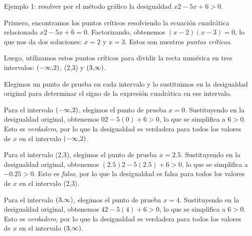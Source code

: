 \documentclass[a4paper,12pt]{article}
\begin{document}
\vspace{0.5cm}

Ejemplo 1: resolver por el método gráfico la desigualdad $x2-5x+6 > 0$.\par

\vspace{0.5cm}

Primero, encontramos los puntos críticos resolviendo la ecuación cuadrática relacionada $x2-5x+6=0$. Factorizando, obtenemos $(x-2)(x-3)=0$, lo que nos da dos soluciones: $x=2$ y $x=3$. Estos son nuestros \emph{puntos críticos}.\\

\vspace{0.5cm}

Luego, utilizamos estos puntos críticos para dividir la recta numérica en tres intervalos: $\interval({-\infty,2})$, (2,3) y $\interval({3,\infty})$.\\

\vspace{0.5cm}

Elegimos un punto de prueba en cada intervalo y lo sustituimos en la desigualdad original para determinar el signo de la expresión cuadrática en ese intervalo.\par

\vspace{0.5cm}

Para el intervalo $\interval({-\infty,2})$, elegimos el punto de prueba $x=0$. Sustituyendo en la desigualdad original, obtenemos $02-5(0)+6>0$, lo que se simplifica a $6>0$. Esto es \emph{verdadero}, por lo que la desigualdad es verdadera para todos los valores de $x$ en el intervalo $\interval({-\infty,2})$.\\

\vspace{0.5cm}

Para el intervalo (2,3), elegimos el punto de prueba $x=2.5$. Sustituyendo en la desigualdad original, obtenemos $(2.5)2-5(2.5)+6>0$, lo que se simplifica a $-0.25>0$. Esto es \emph{falso}, por lo que la desigualdad es falsa para todos los valores de $x$ en el intervalo (2,3).\\

\vspace{0.5cm}

Para el intervalo $\interval({3,\infty})$, elegimos el punto de prueba $x=4$. Sustituyendo en la desigualdad original, obtenemos $42-5(4)+6>0$, lo que se simplifica a $6>0$. Esto es \emph{verdadero}, por lo que la desigualdad es verdadera para todos los valores de $x$ en el intervalo $\interval({3,\infty})$.\\
\end{document}
